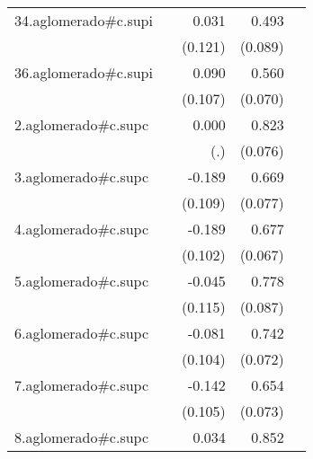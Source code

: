 {\begin{longtable}{l*{4}{D{.}{.}{-1}}}
\addlinespace
34.aglomerado#c.supi&                     &       0.031         &       0.493\sym{***}&                     \\
            &                     &     (0.121)         &     (0.089)         &                     \\
\addlinespace
36.aglomerado#c.supi&                     &       0.090         &       0.560\sym{***}&                     \\
            &                     &     (0.107)         &     (0.070)         &                     \\
\addlinespace
2.aglomerado#c.supc&                     &       0.000         &       0.823\sym{***}&                     \\
            &                     &         (.)         &     (0.076)         &                     \\
\addlinespace
3.aglomerado#c.supc&                     &      -0.189         &       0.669\sym{***}&                     \\
            &                     &     (0.109)         &     (0.077)         &                     \\
\addlinespace
4.aglomerado#c.supc&                     &      -0.189         &       0.677\sym{***}&                     \\
            &                     &     (0.102)         &     (0.067)         &                     \\
\addlinespace
5.aglomerado#c.supc&                     &      -0.045         &       0.778\sym{***}&                     \\
            &                     &     (0.115)         &     (0.087)         &                     \\
\addlinespace
6.aglomerado#c.supc&                     &      -0.081         &       0.742\sym{***}&                     \\
            &                     &     (0.104)         &     (0.072)         &                     \\
\addlinespace
7.aglomerado#c.supc&                     &      -0.142         &       0.654\sym{***}&                     \\
            &                     &     (0.105)         &     (0.073)         &                     \\
\addlinespace
8.aglomerado#c.supc&                     &       0.034         &       0.852\sym{***}&                     \\

\end{longtable}}
